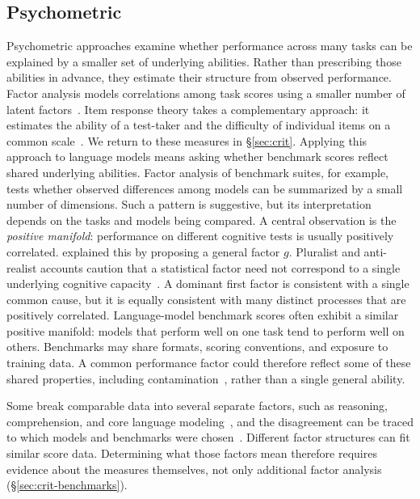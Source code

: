 \documentclass[acmsmall,screen,review,anonymous]{acmart}
\begin{document}
\subsection{Psychometric}
Psychometric approaches examine whether performance across many tasks can be explained by a smaller set of underlying abilities.
%
Rather than prescribing those abilities in advance, they estimate their structure from observed performance.
%
Factor analysis models correlations among task scores using a smaller number of latent factors~\citep{spearman1904}.
%
Item response theory takes a complementary approach: it estimates the ability of a test-taker and the difficulty of individual items on a common scale~\citep{embretson2000irt}.
%
We return to these measures in \S\ref{sec:crit}.
%
Applying this approach to language models means asking whether benchmark scores reflect shared underlying abilities.
%
Factor analysis of benchmark suites, for example, tests whether observed differences among models can be summarized by a small number of dimensions.
%
Such a pattern is suggestive, but its interpretation depends on the tasks and models being compared.
%
A central observation is the \emph{positive manifold}: performance on different cognitive tests is usually positively correlated.
%
\citet{spearman1904} explained this by proposing a general factor $g$.
%
Pluralist and anti-realist accounts caution that a statistical factor need not correspond to a single underlying cognitive capacity~\citep{gardner1983, gould1996mismeasure}.
%
A dominant first factor is consistent with a single common cause, but it is equally consistent with many distinct processes that are positively correlated. 
%
Language-model benchmark scores often exhibit a similar positive manifold: models that perform well on one task tend to perform well on others.
%
Benchmarks may share formats, scoring conventions, and exposure to training data.
%
A common performance factor could therefore reflect some of these shared properties, including contamination~\citep{magar-schwartz-2022-data}, rather than a single general ability.

Some break comparable data into several separate factors, such as reasoning, comprehension, and core language modeling~\citep{burnell2023revealingstructurelanguagemodel}, and the disagreement can be traced to which models and benchmarks were chosen~\citep{ye2026largelanguagemodelpsychometrics}.
%
Different factor structures can fit similar score data.
%
Determining what those factors mean therefore requires evidence about the measures themselves, not only additional factor analysis (\S\ref{sec:crit-benchmarks}).
\end{document}
